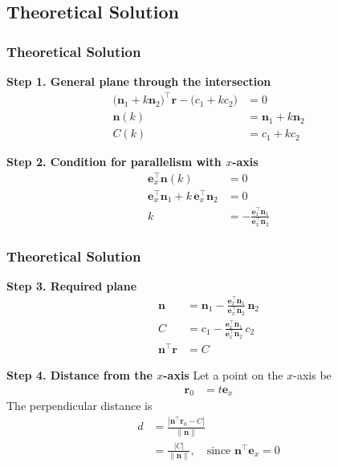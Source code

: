\documentclass{beamer}
\theoremstyle{remark}
\let\vec\mathbf
\numberwithin{equation}{section}
\begin{document}
\subsection{Theoretical Solution }
\begin{frame}
\frametitle{Theoretical Solution}
\textbf{Step 1. General plane through the intersection}
\begin{align}
\big(\vec{n}_1 + k \vec{n}_2\big)^\top \vec{r} - \big(c_1 + k c_2\big) &= 0 \\
\vec{n}(k) &= \vec{n}_1 + k \vec{n}_2 \\
C(k) &= c_1 + k c_2
\end{align}

\textbf{Step 2. Condition for parallelism with $x$-axis}
\begin{align}
\vec{e}_x^\top \vec{n}(k) &= 0 \\
\vec{e}_x^\top \vec{n}_1 + k\, \vec{e}_x^\top \vec{n}_2 &= 0 \\
k &= -\frac{\vec{e}_x^\top \vec{n}_1}{\vec{e}_x^\top \vec{n}_2}
\end{align}

\end{frame}

\begin{frame}
\frametitle{Theoretical Solution}
\textbf{Step 3. Required plane}
\begin{align}
\vec{n} &= \vec{n}_1 - \frac{\vec{e}_x^\top \vec{n}_1}{\vec{e}_x^\top \vec{n}_2}\,\vec{n}_2 \\
C &= c_1 - \frac{\vec{e}_x^\top \vec{n}_1}{\vec{e}_x^\top \vec{n}_2}\,c_2 \\
\vec{n}^\top \vec{r} &= C
\end{align}

\textbf{Step 4. Distance from the $x$-axis}
Let a point on the $x$-axis be
\begin{align}
\vec{r}_0 &= t \vec{e}_x
\end{align}
The perpendicular distance is
\begin{align}
d &= \frac{\left|\vec{n}^\top \vec{r}_0 - C\right|}{\|\vec{n}\|} \\
&= \frac{|C|}{\|\vec{n}\|}, \quad \text{since } \vec{n}^\top \vec{e}_x = 0
\end{align}

\end{frame}
\end{document}
